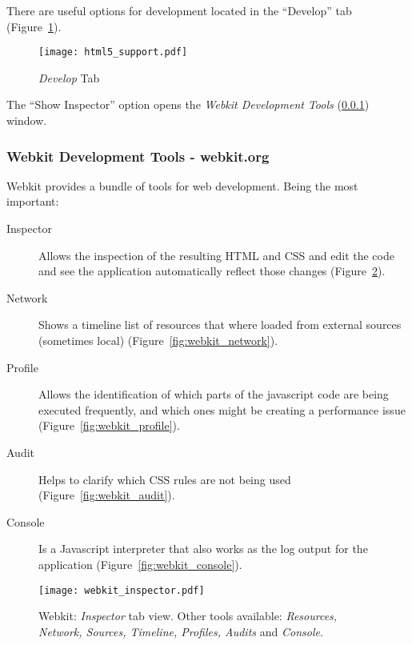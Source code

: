       There are useful options for development located in the ``Develop'' tab (Figure~\ref{fig:html5_support}).

      \begin{figure}[H]
        \begin{center}
          \texttt{[image: html5\_support.pdf]}
        \end{center}
        \caption{\emph{Develop} Tab}
        \label{fig:html5_support}
      \end{figure}

      The ``Show Inspector'' option opens the \emph{Webkit Development Tools} (\ref{ssub:webkit_tools}) window.

    \subsubsection{Webkit Development Tools - webkit.org} %
    \label{ssub:webkit_tools}

      Webkit provides a bundle of tools for web development.
      Being the most important:

      \begin{description}
        \item[Inspector] Allows the inspection of the resulting HTML and CSS and edit the code and see the application automatically reflect those changes (Figure~\ref{fig:webkit_inspector}).
        \item[Network] Shows a timeline list of resources that where loaded from external sources (sometimes local) (Figure~\ref{fig:webkit_network}).
        \item[Profile] Allows the identification of which parts of the javascript code are being executed frequently, and which ones might be creating a performance issue (Figure~\ref{fig:webkit_profile}).
        \item[Audit] Helps to clarify which CSS rules are not being used (Figure~\ref{fig:webkit_audit}).
        \item[Console] Is a Javascript interpreter that also works as the log output for the application (Figure~\ref{fig:webkit_console}).
      \end{description}

      \begin{figure}[ht]
        \begin{center}
          \texttt{[image: webkit\_inspector.pdf]}
        \end{center}
        \caption{Webkit: \emph{Inspector} tab view. Other tools available: \emph{Resources, Network, Sources, Timeline, Profiles, Audits} and \emph{Console}.}
        \label{fig:webkit_inspector}
      \end{figure}

